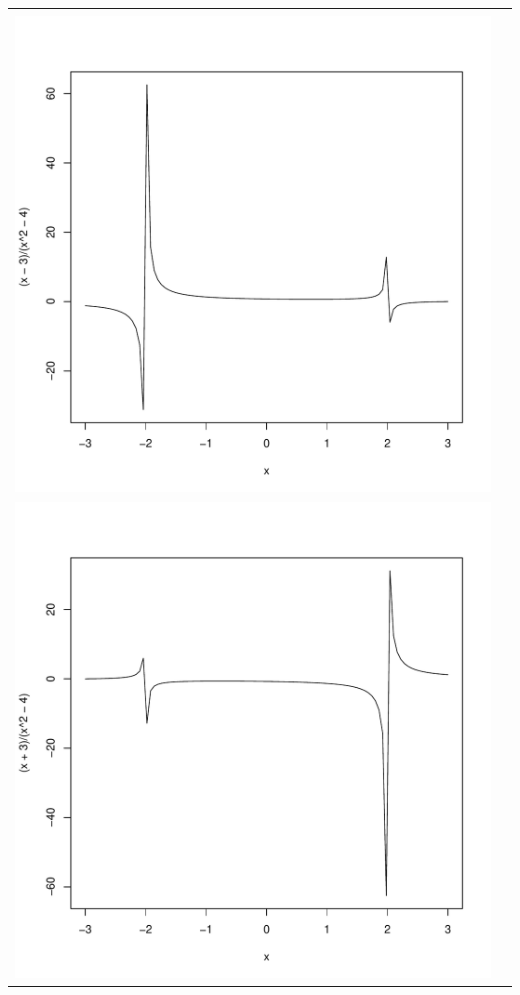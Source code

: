 \documentclass[12pt,b5paper]{ltjsarticle}
\begin{document}
\begin{tabular}{c|c}
\begin{minipage}{200pt}
 \end{minipage}\\ \hline
 \begin{minipage}{200pt}
  $a=-3$\\
  \includegraphics[scale=.35]{m3.pdf}
 \end{minipage} &
 \begin{minipage}{200pt}
  $a=3$\\
  \includegraphics[scale=.35]{p3.pdf}
 \end{minipage}\\
\end{tabular}
\end{document}
